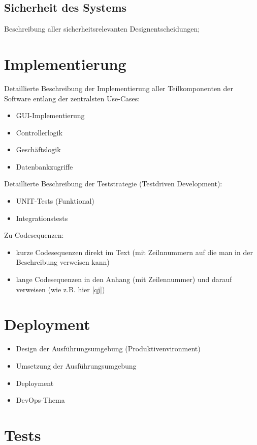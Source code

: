 \section{Sicherheit des Systems}
Beschreibung aller sicherheitsrelevanten Designentscheidungen;

\chapter{Implementierung}
Detaillierte Beschreibung der Implementierung aller Teilkomponenten der Software entlang der zentralsten Use-Cases:

\begin{itemize}
	\item GUI-Implementierung
	\item Controllerlogik
	\item Geschäftslogik
	\item Datenbankzugriffe
\end{itemize}

Detaillierte Beschreibung der Teststrategie (Testdriven Development):

\begin{itemize}
	\item UNIT-Tests (Funktional)
	\item Integrationstests
\end{itemize}

Zu Codesequenzen:
\begin{itemize}
	\item kurze Codesequenzen direkt im Text (mit Zeilnnummern auf die man in der Beschreibung verweisen kann)
	\item lange Codesequenzen in den Anhang (mit Zeilennummer) und darauf verweisen (wie z.B. hier \cref{qj})
\end{itemize}

\chapter{Deployment}
\begin{itemize}
	\item Design der Ausführungsumgebung (Produktivenvironment)
	\item Umsetzung der Ausführungsumgebung
	\item Deployment
	\item DevOps-Thema
\end{itemize}

\chapter{Tests}

